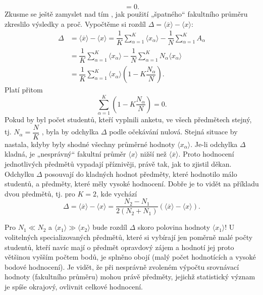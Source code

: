 \begin{mdframed}[style=mdexam]
\begin{example}
\begin{equation*}
        = 0.
    \end{equation*}
    Zkusme se ještě zamyslet nad tím , jak použití „špatného“ fakultního průměru zkreslilo výsledky
    a proč. Vypočtěme si rozdíl \(\Delta = \langle \overline{x} \rangle - \langle x \rangle\):
    \begin{align*}
      \Delta &= \langle \overline{x} \rangle - \langle x \rangle 
              = \dfrac{1}{K}\sum_{\alpha=1}^{K}\langle x_\alpha \rangle
              - \dfrac{1}{N}\sum_{\alpha=1}^{K}A_\alpha                           \\
             &= \dfrac{1}{K}\sum_{\alpha=1}^{K}\langle x_\alpha \rangle
              - \dfrac{1}{N}\sum_{\alpha=1}^{K}N_\alpha\langle x_\alpha \rangle   \\
             &= \dfrac{1}{K}\sum_{\alpha=1}^{K}\langle x_\alpha\rangle\left(1 - 
               K\dfrac{N_\alpha}{N}\right).
    \end{align*}
    Platí přitom
    \begin{equation*}
      \sum_{\alpha=1}^{K}\left(1 - K\dfrac{N_\alpha}{N}\right) = 0.
    \end{equation*}
    Pokud by byl počet studentů, kteří vyplnili anketu, ve všech předmětech stejný, tj. \(N_\alpha =
    \dfrac{N}{K}\) , byla by odchylka \(\Delta\) podle očekávání nulová. Stejná situace by nastala,
    kdyby byly shodné všechny průměrné hodnoty \(\langle x_\alpha \rangle\). Je-li odchylka
    \(\Delta\) kladná, je „nesprávný“ fakultní průměr \(\langle x \rangle\) nižší než \(\langle
    \overline{x} \rangle\). Proto hodnocení jednotlivých předmětů vypadají příznivěji, právě tak,
    jak to zjistil děkan. Odchylku \(\Delta\) posouvají do kladných hodnot předměty, které hodnotilo
    málo studentů, a předměty, které měly vysoké hodnocení. Dobře je to vidět na příkladu dvou
    předmětů, tj. pro \(K = 2\), kde vychází
    \begin{equation*}
      \Delta = \langle \overline{x} \rangle - \langle x \rangle 
            = \dfrac{N_2 - N_1}{2(N_2+N_1)}\left(\langle\overline{x}\rangle-\langle x\rangle\right).
    \end{equation*}
    
    Pro \(N_1\ll N_2\) a \(\langle x_1 \rangle  \gg \langle x_2 \rangle\) bude rozdíl \(\Delta\)
    skoro polovina hodnoty \(\langle x_1 \rangle\)! U volitelných specializovaných předmětů, které
    si vybírají jen poměrně malé počty studentů, kteří navíc mají o předmět opravdový zájem a
    hodnotí jej proto většinou vyšším počtem bodů, je splněno obojí (malý počet hodnotících a vysoké
    bodové hodnocení). Je vidět, že při nesprávně zvoleném výpočtu srovnávací hodnoty (fakultního
    průměru) mohou právě předměty, jejichž statistický význam je spíše okrajový, ovlivnit celkové
    hodnocení.
  \end{example}
\end{mdframed}